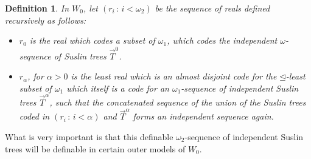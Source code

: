 \documentclass[a4paper,11pt]{article}
\newtheorem{definition}[theorem]{Definition}
\begin{document}
\begin{definition}
In $W_0$, 
let $(r_i \, : \, i < \omega_2)$ be the sequence of reals defined recursively
 as follows:
 
 \begin{itemize}
  \item $r_0$ is the real which codes a subset of $\omega_1$, which codes the independent $\omega$-sequence of Suslin trees $\vec{T}^0$.
 
  \item $r_{\alpha}$, for $\alpha > 0$ is the least real which is an almost disjoint code for the $\unlhd$-least subset of $\omega_1$ which itself is a code for an $\omega_1$-sequence of independent Suslin trees $\vec{T}^{\alpha}$,
  such that the concatenated sequence of the union of the Suslin trees coded in $(r_{i} \, : \, i < \alpha)$ and $\vec{T}^{\alpha}$
  forms an independent sequence again.
 \end{itemize}
 
\end{definition}

What is very important is that this definable $\omega_2$-sequence of
independent Suslin trees will be definable in certain outer models of $W_0$.
\end{document}
